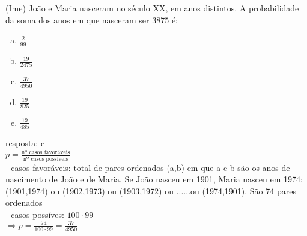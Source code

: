 \begin{ex}
(Ime)  João e Maria nasceram no século XX, em anos distintos. A probabilidade da soma dos anos em que nasceram ser 3875 é:
   \begin{enumerate}  [(a)]
       \item $\frac{2}{99}$
       \item $\frac{19}{2475}$
       \item $\frac{37}{4950}$
       \item $\frac{19}{825}$
       \item $\frac{19}{485}$
   \end{enumerate}
     \begin{sol}
     resposta: c \\
    $p=\frac{\text {nº casos favoráveis}}{\text{nº casos possíveis}}$\\
    - casos favoráveis: total de pares ordenados (a,b) em que a e b são os anos de nascimento de João e de Maria. Se João nasceu em 1901, Maria nasceu em 1974: (1901,1974) ou (1902,1973) ou (1903,1972) ou ......ou (1974,1901). São 74 pares ordenados \\
    - casos possíves: $100\cdot99$\\
    $\Longrightarrow p=\frac{74}{100\cdot99}= \frac{37}{4950}$
     \end{sol}
\end{ex}